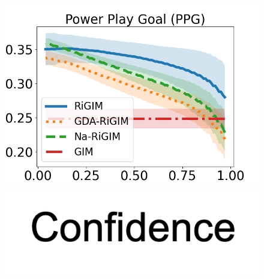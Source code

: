 \documentclass{article}
\begin{document}
\begin{figure}[htbp]
\begin{minipage}{0.16\textwidth}
    \includegraphics[scale=0.14]{figures/risk_curve_PPG_shadow.png}\par
    \vspace{-0.05in}
    \includegraphics[scale=0.12]{figures/confidence_x_label.png}
    \end{minipage}
    \begin{minipage}{0.01\textwidth}
    \centering

\end{minipage}
\end{figure}
\end{document}
